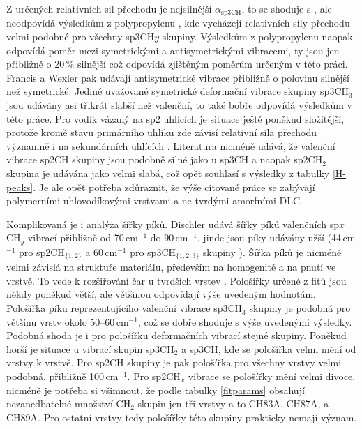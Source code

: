 Z určených relativních sil přechodu je nejsilnější $\alpha_\mathrm{sp3CH}$, to se shoduje s \cite{Francis1950, Wexler1967}, ale neodpovídá výsledkům z polypropylenu \cite{Heitz1998}, kde vycházejí relativních síly přechodu velmi podobné pro všechny sp3CH$y$ skupiny. Výsledkům z polypropylenu naopak odpovídá poměr mezi symetrickými a antisymetrickými vibracemi, ty jsou jen přibližně o 20\,\% silnější což odpovídá zjištěným poměrům určeným v této práci. Francis \cite{Francis1950} a Wexler \cite{Wexler1967} pak udávají antisymetrické vibrace přibližně o polovinu silnější než symetrické. Jediné uvažované symetrické deformační vibrace skupiny sp3CH$_3$ jsou udávány asi třikrát slabší než valenční, to také bobře odpovídá výsledkům v této práce.  
Pro vodík vázaný na sp2 uhlících je situace ještě poněkud složitější, protože kromě stavu primárního uhlíku zde závisí relativní síla přechodu významně i na sekundárních uhlících \cite{Heitz1998}. Literatura nicméně udává, že valenční vibrace sp2CH skupiny jsou podobně silné jako u sp3CH a naopak sp2CH$_2$ skupina je udávána jako velmi slabá, což opět souhlasí s výsledky z tabulky \ref{H-peaks}. Je ale opět potřeba zdůraznit, že výše citované práce se zabývají polymerními uhlovodíkovými vrstvami a ne tvrdými amorfními DLC.   

Komplikovaná je i analýza šířky píků. Dischler \cite{Dischler1983} udává šířky píků valenčních sp$x$CH$_y$ vibrací přibližně od 70\,cm$^{-1}$ do 90\,cm$^{-1}$, jinde jsou píky udávány užší (44\,cm$^{-1}$ pro sp2CH$_{\{1,2\}}$ a 60\,cm$^{-1}$ pro sp3CH$_{\{1,2,3\}}$ skupiny \cite{Zajickova2011}). Šířka píků je nicméně velmi závislá na struktuře materiálu, především na homogenitě a na pnutí ve vrstvě. 
To vede k rozšiřování čar u tvrdších vrstev \cite{Ristein1998}. Pološířky určené z fitů jsou někdy poněkud větší, ale většinou odpovídají výše uvedeným hodnotám. Pološířka píku reprezentujícího valenční vibrace sp3CH$_3$ skupiny je podobná pro většinu vrstv okolo 50--60\,cm$^{-1}$, což se dobře shoduje s výše uvedenými výsledky. 
Podobná shoda je i pro pološířku deformačních vibrací stejné skupiny. Poněkud horší je situace u vibrací skupin sp3CH$_2$ a sp3CH, kde se pološířka velmi mění od vrstvy k vrstvě. Pro sp2CH skupiny je pak pološířka pro všechny vrstvy velmi podobná, přibližně 100\,cm$^{-1}$. Pro sp2CH$_x$ vibrace se pološířky mění velmi divoce, nicméně je potřeba si všimnout, že podle tabulky \ref{fitparams} obsahují nezanedbatelné množství CH$_2$ skupin jen tři vrstvy a to CH83A, CH87A, a CH89A. Pro ostatní vrstvy tedy pološířky této skupiny prakticky nemají význam.

